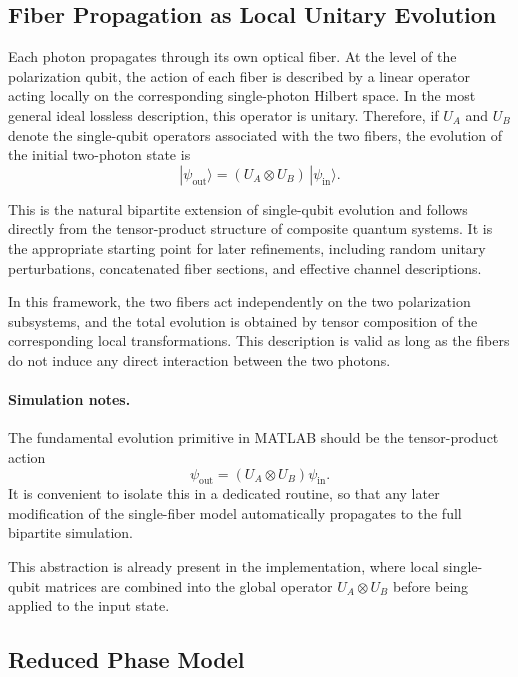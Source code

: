 \documentclass[a4paper]{article}
\begin{document}

\subsection{Fiber Propagation as Local Unitary Evolution}

Each photon propagates through its own optical fiber. At the level of the polarization qubit, the action of each fiber is described by a linear operator acting locally on the corresponding single-photon Hilbert space. In the most general ideal lossless description, this operator is unitary. Therefore, if \(U_A\) and \(U_B\) denote the single-qubit operators associated with the two fibers, the evolution of the initial two-photon state is
\[
|\psi_{\mathrm{out}}\rangle
=
(U_A \otimes U_B)\, |\psi_{\mathrm{in}}\rangle.
\]

This is the natural bipartite extension of single-qubit evolution and follows directly from the tensor-product structure of composite quantum systems. It is the appropriate starting point for later refinements, including random unitary perturbations, concatenated fiber sections, and effective channel descriptions.

In this framework, the two fibers act independently on the two polarization subsystems, and the total evolution is obtained by tensor composition of the corresponding local transformations. This description is valid as long as the fibers do not induce any direct interaction between the two photons.

\paragraph{Simulation notes.}
The fundamental evolution primitive in MATLAB should be the tensor-product action
\[
\psi_{\mathrm{out}} = (U_A \otimes U_B)\psi_{\mathrm{in}}.
\]
It is convenient to isolate this in a dedicated routine, so that any later modification of the single-fiber model automatically propagates to the full bipartite simulation.

This abstraction is already present in the implementation, where local single-qubit matrices are combined into the global operator \(U_A \otimes U_B\) before being applied to the input state.


\subsection{Reduced Phase Model}
\end{document}
